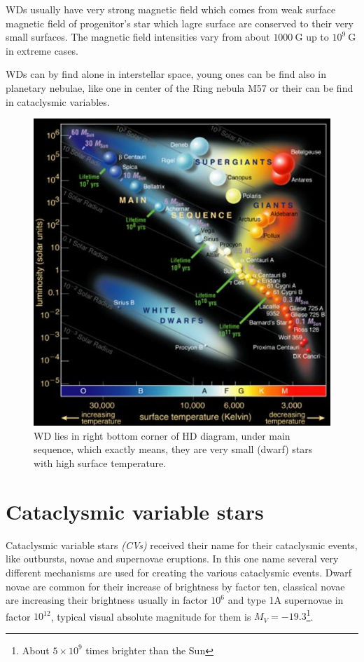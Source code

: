 \documentclass[oneside,a4paper,11pt]{report}
\begin{document}
WDs usually have very strong magnetic field which comes from weak surface magnetic field of progenitor's star which lagre surface are conserved to their very 
small surfaces. The magnetic field intensities vary from about $1000 \:\mathrm{G}$ up to $10^9 \:\mathrm{G}$ in extreme cases.    

WDs can by find alone in interstellar space, young ones can be find also in planetary nebulae, like one  in center of the Ring nebula 
M57 or their can be find in cataclysmic variables.       
 
\begin{figure}[hbt!]
\centering
\includegraphics[totalheight=12cm]{hrdiagram}
\caption{WD lies in right bottom corner of HD diagram, under main 
sequence, which exactly means, they are very small (dwarf) stars with high surface temperature.  }
\label{hrd1} 
\end{figure}


\chapter{Cataclysmic variable stars}

Cataclysmic variable stars \textit{(CVs)} received their name for their cataclysmic events, like outbursts, novae and supernovae eruptions. 
In this one name several very different mechanisms are used for creating the various cataclysmic events.         
Dwarf novae are common for their increase of brightness by factor ten, classical novae are increasing their 
brightness usually in factor $10^6$ and type 1A supernovae in factor $10^{12}$, typical visual absolute magnitude 
for them is $M_V = -19.3$\footnote{About $5\times10^9$ times brighter than the Sun}.  
\end{document}
